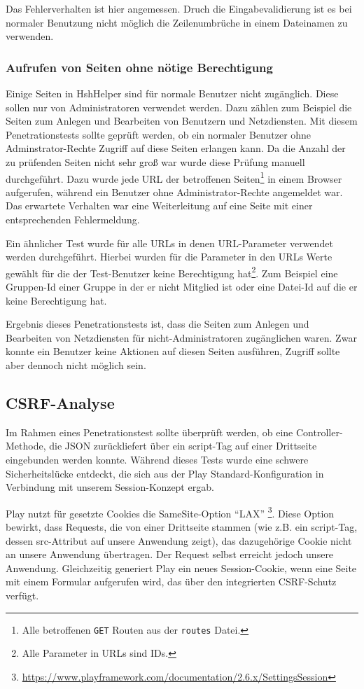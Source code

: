 \documentclass[12pt,DIV14,BCOR10mm,a4paper,parskip=half-,headsepline,headinclude,english,ngerman,bibliography=totocnumbered]{scrreprt}
\begin{document}
Das Fehlerverhalten ist hier angemessen. Druch die Eingabevalidierung ist es bei normaler Benutzung nicht möglich die Zeilenumbrüche in einem Dateinamen zu verwenden.


\subsubsection{Aufrufen von Seiten ohne nötige Berechtigung}
Einige Seiten in HshHelper sind für normale Benutzer nicht zugänglich. Diese sollen nur von Administratoren verwendet werden. Dazu zählen zum Beispiel die Seiten zum Anlegen und Bearbeiten von Benutzern und Netzdiensten. Mit diesem Penetrationstests sollte geprüft werden, ob ein normaler Benutzer ohne Adminstrator-Rechte Zugriff auf diese Seiten erlangen kann. Da die Anzahl der zu prüfenden Seiten nicht sehr groß war wurde diese Prüfung manuell durchgeführt. Dazu wurde jede URL der betroffenen Seiten\footnote{Alle betroffenen \texttt{GET} Routen aus der \texttt{routes} Datei.} in einem Browser aufgerufen, während ein Benutzer ohne Administrator-Rechte angemeldet war. Das erwartete Verhalten war eine Weiterleitung auf eine Seite mit einer entsprechenden Fehlermeldung.

Ein ähnlicher Test wurde für alle URLs in denen URL-Parameter verwendet werden durchgeführt. Hierbei wurden für die Parameter in den URLs Werte gewählt für die der Test-Benutzer keine Berechtigung hat\footnote{Alle Parameter in URLs sind IDs.}. Zum Beispiel eine Gruppen-Id einer Gruppe in der er nicht Mitglied ist oder eine Datei-Id auf die er keine Berechtigung hat. 

Ergebnis dieses Penetrationstests ist, dass die Seiten zum Anlegen und Bearbeiten von Netzdiensten für nicht-Administratoren zugänglichen waren. Zwar konnte ein Benutzer keine Aktionen auf diesen Seiten ausführen, Zugriff sollte aber dennoch nicht möglich sein.

\subsection{CSRF-Analyse}
\label{csrf:analyse} 
Im Rahmen eines Penetrationstest sollte überprüft werden, ob eine Controller-Methode, die JSON zurückliefert über ein script-Tag auf einer Drittseite eingebunden werden konnte. Während dieses Tests wurde eine schwere Sicherheitslücke entdeckt, die sich aus der Play Standard-Konfiguration in Verbindung mit unserem Session-Konzept ergab.

Play nutzt für gesetzte Cookies die SameSite-Option \enquote{LAX} \footnote{\url{https://www.playframework.com/documentation/2.6.x/SettingsSession}}. Diese Option bewirkt, dass Requests, die von einer Drittseite stammen (wie z.B. ein script-Tag, dessen src-Attribut auf unsere Anwendung zeigt), das dazugehörige Cookie nicht an unsere Anwendung übertragen. Der Request selbst erreicht jedoch unsere Anwendung. Gleichzeitig generiert Play ein neues Session-Cookie, wenn eine Seite mit einem Formular aufgerufen wird, das über den integrierten CSRF-Schutz verfügt.
\end{document}
